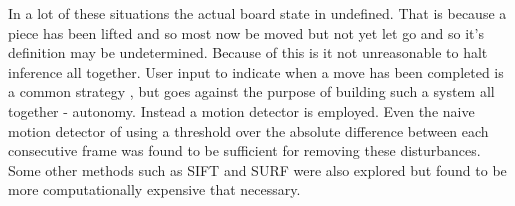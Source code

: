 In a lot of these situations the actual board state in undefined.  That is because a piece has been lifted and so most now be moved but not yet let go 
and so it's definition may be undetermined.  Because of this is it not unreasonable to halt inference all together.  User input to indicate when a move
has been completed is a common strategy \cite{}, but goes against the purpose of building such a system all together - autonomy.  Instead a motion detector is 
employed.  Even the naive motion detector of using a threshold over the absolute difference between each consecutive frame was found to be sufficient for removing these
disturbances.  Some other methods such as SIFT and SURF were also explored but found to be more computationally expensive that necessary.
